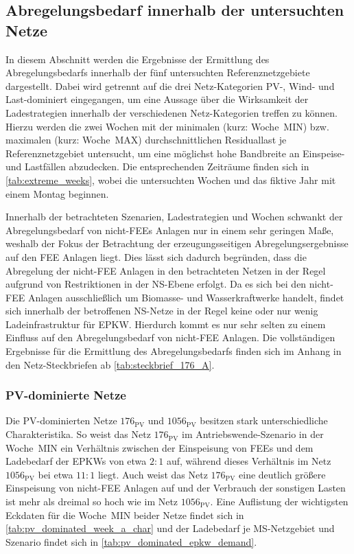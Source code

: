 \subsection{Abregelungsbedarf innerhalb der untersuchten Netze}\label{chap:cur_results}

In diesem Abschnitt werden die Ergebnisse der Ermittlung des Abregelungsbedarfs innerhalb der fünf untersuchten Referenznetzgebiete dargestellt.
Dabei wird getrennt auf die drei Netz-Kategorien \gls{PV}-, Wind- und Last-dominiert eingegangen, um eine Aussage über die Wirksamkeit der Ladestrategien innerhalb der verschiedenen Netz-Kategorien treffen zu können.
Hierzu werden die zwei Wochen mit der minimalen (kurz: Woche~MIN) bzw. maximalen (kurz: Woche~MAX) durchschnittlichen Residuallast je Referenznetzgebiet untersucht, um eine möglichst hohe Bandbreite an Einspeise- und Lastfällen abzudecken.
Die entsprechenden Zeiträume finden sich in \autoref{tab:extreme_weeks}, wobei die untersuchten Wochen und das fiktive Jahr mit einem Montag beginnen.



Innerhalb der betrachteten Szenarien, Ladestrategien und Wochen schwankt der Abregelungsbedarf von nicht-\glspl{FEE} Anlagen nur in einem sehr geringen Maße, weshalb der Fokus der Betrachtung der erzeugungsseitigen Abregelungsergebnisse auf den \gls{FEE} Anlagen liegt.
Dies lässt sich dadurch begründen, dass die Abregelung der nicht-\gls{FEE} Anlagen in den betrachteten Netzen in der Regel aufgrund von Restriktionen in der \gls{NS}-Ebene erfolgt.
Da es sich bei den nicht-\gls{FEE} Anlagen ausschließlich um Biomasse- und Wasserkraftwerke handelt, findet sich innerhalb der betroffenen \gls{NS}-Netze in der Regel keine oder nur wenig Ladeinfrastruktur für \gls{EPKW}.
Hierdurch kommt es nur sehr selten zu einem Einfluss auf den Abregelungsbedarf von nicht-\gls{FEE} Anlagen.
Die vollständigen Ergebnisse für die Ermittlung des Abregelungsbedarfs finden sich im Anhang in den Netz-Steckbriefen ab \autoref{tab:steckbrief_176_A}.


\subsubsection{PV-dominierte Netze}

Die \gls{PV}-dominierten Netze \(176_{\text{PV}}\) und \(1056_{\text{PV}}\) besitzen stark unterschiedliche Charakteristika.
So weist das Netz \(176_{\text{PV}}\) im Antriebswende-Szenario in der Woche~MIN ein Verhältnis zwischen der Einspeisung von \glspl{FEE} und dem Ladebedarf der \glspl{EPKW} von etwa \(2:1\) auf, während dieses Verhältnis im Netz \(1056_{\text{PV}}\) bei etwa \(11:1\) liegt.
Auch weist das Netz \(176_{\text{PV}}\) eine deutlich größere Einspeisung von nicht-\gls{FEE} Anlagen auf und der Verbrauch der sonstigen Lasten ist mehr als dreimal so hoch wie im Netz \(1056_{\text{PV}}\).
Eine Auflistung der wichtigsten Eckdaten für die Woche~MIN beider Netze findet sich in \autoref{tab:pv_dominated_week_a_char} und der Ladebedarf je \gls{MS}-Netzgebiet und Szenario findet sich in \autoref{tab:pv_dominated_epkw_demand}.


